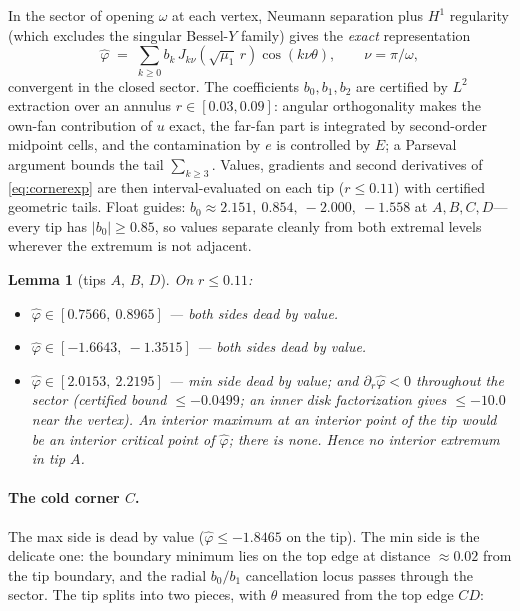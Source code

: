 \documentclass[11pt]{article}
\newtheorem{lemma}{Lemma}
\newcommand{\phih}{\hat\varphi}
\begin{document}
In the sector of opening $\omega$ at each vertex, Neumann separation
plus $H^1$ regularity (which excludes the singular Bessel-$Y$ family)
gives the \emph{exact} representation
\begin{equation}\label{eq:cornerexp}
\phih \;=\; \sum_{k\ge0} b_k\,J_{k\nu}(\sqrt{\mu_1}\,r)\cos(k\nu\theta),
\qquad \nu=\pi/\omega,
\end{equation}
convergent in the closed sector. The coefficients $b_0,b_1,b_2$ are
certified by $L^2$ extraction over an annulus $r\in[0.03,0.09]$:
angular orthogonality makes the own-fan contribution of $u$ exact, the
far-fan part is integrated by second-order midpoint cells, and the
contamination by $e$ is controlled by $E$; a Parseval argument bounds
the tail $\sum_{k\ge3}$. Values, gradients and second derivatives of
\eqref{eq:cornerexp} are then interval-evaluated on each tip
($r\le0.11$) with certified geometric tails. Float guides:
$b_0\approx 2.151,\ 0.854,\ -2.000,\ -1.558$ at $A,B,C,D$---every tip
has $|b_0|\ge0.85$, so values separate cleanly from both extremal
levels wherever the extremum is not adjacent.

\begin{lemma}[tips $A$, $B$, $D$]\label{lem:tipsABD}
On $r\le0.11$:
\begin{itemize}
\item[$B$:] $\phih\in[0.7566,\ 0.8965]$ --- both sides dead by value.
\item[$D$:] $\phih\in[-1.6643,\ -1.3515]$ --- both sides dead by value.
\item[$A$:] $\phih\in[2.0153,\ 2.2195]$ --- min side dead by value; and
$\partial_r\phih<0$ throughout the sector (certified bound
$\le-0.0499$; an inner disk factorization gives $\le-10.0$ near the
vertex). An interior maximum at an interior point of the tip would be
an interior critical point of $\phih$; there is none. Hence no interior
extremum in tip $A$.
\end{itemize}
\end{lemma}

\paragraph{The cold corner $C$.}
The max side is dead by value ($\phih\le-1.8465$ on the tip). The min
side is the delicate one: the boundary minimum lies on the top edge at
distance ${\approx}0.02$ from the tip boundary, and the radial
$b_0/b_1$ cancellation locus passes through the sector. The tip splits
into two pieces, with $\theta$ measured from the top edge $CD$:
\end{document}
